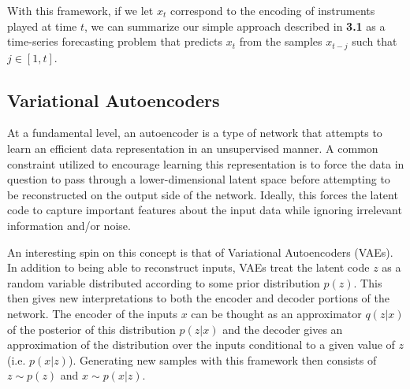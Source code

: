 \documentclass[10pt,twocolumn]{article}
\begin{document}
With this framework, if we let $x_t$ correspond to the encoding of instruments played at time $t$, we can summarize our simple approach described in \textbf{3.1} as a time-series forecasting problem that predicts $x_{t}$ from the samples $x_{t - j}$ such that $j \in [1, t]$.

\subsection{Variational Autoencoders}

At a fundamental level, an autoencoder is a type of network that attempts to learn an efficient data representation in an unsupervised manner. A common constraint utilized to encourage learning this representation is to force the data in question to pass through a lower-dimensional latent space before attempting to be reconstructed on the output side of the network. Ideally, this forces the latent code to capture important features about the input data while ignoring irrelevant information and/or noise.

\begin{figure}[H]
\end{figure}

An interesting spin on this concept is that of Variational Autoencoders (VAEs). In addition to being able to reconstruct inputs, VAEs treat the latent code $z$ as a random variable distributed according to some prior distribution $p(z)$. This then gives new interpretations to both the encoder and decoder portions of the network. The encoder of the inputs $x$ can be thought as an approximator $q(z | x)$ of the posterior of this distribution $p(z | x)$ and the decoder gives an approximation of the distribution over the inputs conditional to a given value of $z$ (i.e. $p(x | z)$). Generating new samples with this framework then consists of $z \sim p(z)$ and $x \sim p(x | z)$.
\end{document}
